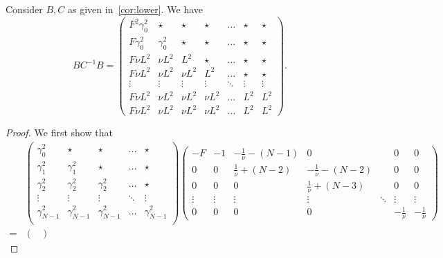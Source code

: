 \documentclass{article}
\begin{document}
\begin{toappendix}
\begin{lemma}
  \label{lemma:inverse}
  Consider $B,C$ as given in~\cref{cor:lower}.
  We have
  \[
    B C^{-1} B =
    \left(\begin{array}{ccccccc}
      F^2\gamma_0^2 & \star  & \star  & \star  & \dots & \star  & \star  \\
      F\gamma_0^2  & \gamma_0^2 & \star & \star  & \dots & \star & \star   \\
      F \nu L^2 & \nu L^2 & L^2 & \star & \dots & \star & \star    \\
      F \nu L^2 & \nu L^ 2 & \nu L^2 & L^2 &\dots  &  \star &\star   \\
      \vdots & \vdots & \vdots & \vdots &  \ddots  & \vdots & \vdots  \\
      F \nu L^2 & \nu L^ 2 & \nu L^ 2 & \nu L^ 2 & \dots & L^2 & L^2  \\
      F \nu L^2 & \nu L^ 2 & \nu L^ 2 & \nu L^ 2 & \dots & L^2 & L^2  
         \end{array}
        \right).
  \]
\end{lemma}
\begin{proof}
  We first show that
  \begin{align*}
    & \left(\begin{array}{ccccc}
      \gamma_{0}^2  & \star & \star  & \dots & \star \\
      \gamma_{1}^2 & \gamma_{1}^2 & \star & \dots & \star \\
      \gamma_{2}^2  & \gamma_{2}^2 & \gamma_{2}^2 & \dots & \star \\
      \vdots &  \vdots & \vdots & \ddots & \vdots \\
      \gamma_{N\!-\!1}^2 & \gamma_{N\!-\!1}^2 & \gamma_{N\!-\!1}^2 & \dots & \gamma_{N\!-\!1}^2   \\
    \end{array}\right)
      \begin{pmatrix}
        -F & -1 & -\frac{1}{\nu}- (N-1) & 0 &  & 0 & 0 \\
        0& 0 & \frac{1}{\nu}+ (N-2) & -\frac{1}{\nu}- (N-2)& & 0& 0 \\
        0& 0 & 0 & \frac{1}{\nu}+ (N-3) & &  0 & 0 \\
        \vdots & \vdots & \vdots & \vdots & \ddots&  \vdots & \vdots\\
        0 & 0 & 0 &0 &  & -\frac{1}{\nu} & -\frac{1}{\nu}
      \end{pmatrix}\\
    =&
       \begin{pmatrix}

\end{pmatrix}
\end{align*}
\end{proof}
\end{toappendix}
\end{document}
